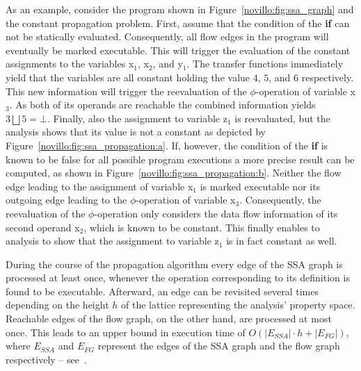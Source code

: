 As an example, consider the program shown in Figure~\ref{novillo:fig:ssa_graph}
and the constant propagation problem. First,
assume that the condition of the \textbf{if} can not be statically evaluated.
Consequently, all flow edges in the program will eventually be marked
executable. This will trigger the evaluation of the constant assignments to
the variables x$_1$,  x$_2$, and y$_1$. The transfer functions immediately yield
that the variables are all constant holding the value $4$, $5$, and $6$
respectively. This new information will trigger the reevaluation of the
$\phi$-operation of variable x$_3$. As both of its operands are reachable the
combined information yields $3 \bigsqcup 5 = \bot$. Finally, also the assignment
to variable z$_1$ is reevaluated, but the analysis shows that its value is not a
constant as depicted by Figure~\ref{novillo:fig:ssa_propagation:a}. If, however,
the condition of the \textbf{if} is known to be false for all possible program
executions a more precise result can be computed, as shown in
Figure~\ref{novillo:fig:ssa_propagation:b}. Neither the flow edge leading to the
assignment of variable x$_1$ is marked executable nor its outgoing edge leading
to the $\phi$-operation of variable x$_3$. Consequently, the reevaluation of
the $\phi$-operation only considers the data flow information of its second
operand x$_2$, which is known to be constant. This finally enables to analysis
to show that the assignment to variable z$_1$ is in fact constant as well.

During the course of the propagation algorithm every edge of the SSA graph is
processed at least once, whenever the operation corresponding to its definition
is found to be executable. Afterward, an edge can be revisited several times
depending on the height $h$ of the lattice representing the analysis' property
space. Reachable edges of the flow graph, on the other hand, are processed at
most once. This leads to an upper bound in execution time of $O(|E_{SSA}| \cdot
h + |E_{FG}|)$, where $E_{SSA}$ and $E_{FG}$ represent the edges of the
SSA graph and the flow graph respectively -- see~\cite{bib:wegman.ea-91}.

